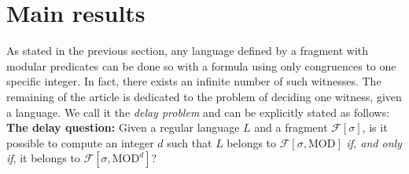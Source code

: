 \documentclass[submission,hidelink]{dmtcs-episciences}
\newcommand{\cF}{\mathcal{F}}
\newcommand{\MOD}{\mathrm{MOD}}
\begin{document}
\section{Main results}\label{Section:Main}

As stated in the previous section, any language defined by a fragment with modular predicates can be done so with a formula using only congruences to one specific integer.
In fact, there exists an infinite number of such witnesses.
The remaining of the article is dedicated to the problem of deciding one witness, given a language.
We call it the \emph{delay problem} and can be explicitly stated as follows:\\
\noindent\textbf{The delay question:}
Given a regular language $L$ and a fragment $\cF[\sigma]$, is it possible to compute an integer $d$ such that $L$ belongs to $\cF[\sigma,\MOD]$ \emph{if, and only if}, it belongs to $\cF[\sigma,\MOD^{d}]$?\\
\end{document}
